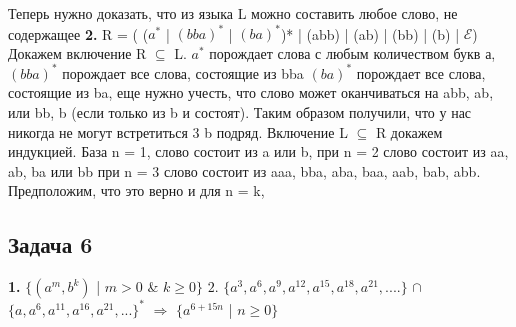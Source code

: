 \documentclass[a4paper,14pt]{article} %
\begin{document}
Теперь нужно доказать, что из языка L можно составить любое слово, не содержащее
\newline
\textbf{2.} R = ( ($a^{*}$ | $(bba)^{*}$ | $(ba)^{*}$)* | (abb) | (ab) | (bb) | (b) | $\mathcal{E}$)
\newline
Докажем включение R $\subseteq$ L.
\newline
$a^{*}$ порождает слова с любым количеством букв а,
$(bba)^{*}$ порождает все слова, состоящие из bba
$(ba)^{*}$ порождает все слова, состоящие из ba,
еще нужно учесть, что слово может оканчиваться на abb, ab, или bb, b (если только из b и состоят).
Таким образом получили, что у нас никогда не могут встретиться 3 b подряд.
\newline 
Включение L $\subseteq$ R докажем индукцией.
База n = 1, слово состоит из a или b, 
при n = 2 слово состоит из aa, ab, ba или bb
при n = 3 слово состоит из aaa, bba, aba, baa, aab, bab, abb.
Предположим, что это верно и для n = k, 
\subsection{Задача 6}
\textbf{1.} $\{(a^{m}, b^{k})$ | $m > 0$ \& $k \geq 0 \}$
\newline 
$2.$ $\{a^3, a^6, a^9, a^{12}, a^{15}, a^{18}, a^{21}, .... \}$ $\cap$  
$\{a, a^6, a^{11}, a^{16}, a^{21}, ... \}^{*}$ 
$\Longrightarrow$ $\{ a^{6+15n}$ | $n \geq 0 \}$
\end{document}
